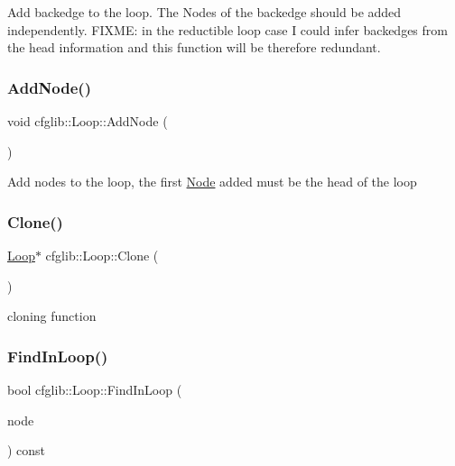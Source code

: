 Add backedge to the loop. The Nodes of the backedge should be added independently. F\+I\+X\+ME\+: in the reductible loop case I could infer backedges from the head information and this function will be therefore redundant. \mbox{\label{classcfglib_1_1Loop_ae6c9f22b961258f08b3f5e75629d0b1e}} 
\subsubsection{\texorpdfstring{Add\+Node()}{AddNode()}}
{\footnotesize\ttfamily void cfglib\+::\+Loop\+::\+Add\+Node (\begin{DoxyParamCaption}\item[{\hyperlink{classcfglib_1_1Node}{Node} $\ast$}]{ }\end{DoxyParamCaption})}

Add nodes to the loop, the first \hyperlink{classcfglib_1_1Node}{Node} added must be the head of the loop \mbox{\label{classcfglib_1_1Loop_a87d6a91d0a7c1174e0c2ce2a205cb41e}} 
\subsubsection{\texorpdfstring{Clone()}{Clone()}}
{\footnotesize\ttfamily \hyperlink{classcfglib_1_1Loop}{Loop}$\ast$ cfglib\+::\+Loop\+::\+Clone (\begin{DoxyParamCaption}\item[{\hyperlink{classcfglib_1_1CloneHandle}{Clone\+Handle} \&}]{ }\end{DoxyParamCaption})}

cloning function \mbox{\label{classcfglib_1_1Loop_acbe30a927df0b77ed4aed07cb1517ba4}} 
\subsubsection{\texorpdfstring{Find\+In\+Loop()}{FindInLoop()}}
{\footnotesize\ttfamily bool cfglib\+::\+Loop\+::\+Find\+In\+Loop (\begin{DoxyParamCaption}\item[{\hyperlink{classcfglib_1_1Node}{Node} $\ast$}]{node }\end{DoxyParamCaption}) const}

